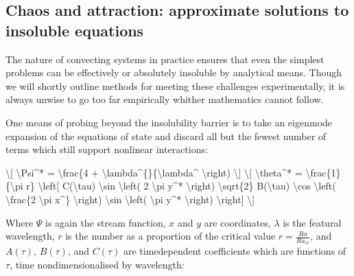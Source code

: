 \documentclass[letterpaper,10pt,english]{jupyterBook}
\begin{document}
\subsection{Chaos and attraction: approximate solutions to insoluble equations}
\label{\detokenize{content/chapter_02_methods/section1:chaos-and-attraction-approximate-solutions-to-insoluble-equations}}
\sphinxAtStartPar
The nature of convecting systems in practice ensures that even the simplest problems can be effectively or absolutely insoluble by analytical means. Though we will shortly outline methods for meeting these challenges experimentally, it is always unwise to go too far empirically whither mathematics cannot follow.

\sphinxAtStartPar
One means of probing beyond the insolubility barrier is to take an eigenmode expansion of the equations of state and discard all but the fewest number of terms which still support nonlinear interactions:

\sphinxAtStartPar
\textbackslash{}{[} \textbackslash{}Psi\textasciicircum{}* = \textbackslash{}frac\{4 + \textbackslash{}lambda\textasciicircum{}\{\}\{\textbackslash{}lambda\textasciicircum{} \textbackslash{}right) \textbackslash{}{]}
\textbackslash{}{[} \textbackslash{}theta\textasciicircum{}* = \textbackslash{}frac\{1\}\{\textbackslash{}pi r\} \textbackslash{}left{[} C(\textbackslash{}tau) \textbackslash{}sin \textbackslash{}left( 2 \textbackslash{}pi y\textasciicircum{}* \textbackslash{}right) \sphinxhyphen{} \textbackslash{}sqrt\{2\} B(\textbackslash{}tau) \textbackslash{}cos \textbackslash{}left( \textbackslash{}frac\{2 \textbackslash{}pi x\textasciicircum{}\} \textbackslash{}right) \textbackslash{}sin \textbackslash{}left( \textbackslash{}pi y\textasciicircum{}* \textbackslash{}right) \textbackslash{}right{]} \textbackslash{}{]}

\sphinxAtStartPar
Where \(\Psi\) is again the stream function, \(x\) and \(y\) are coordinates, \(\lambda\) is the featural wavelength, \(r\) is the  number as a proportion of the critical value \(r = \frac{Ra}{Ra_{cr}}\), and \(A(\tau)\), \(B(\tau)\), and \(C(\tau)\) are time\sphinxhyphen{}dependent coefficients which are functions of \(\tau\), time non\sphinxhyphen{}dimensionalised by wavelength:
\end{document}
